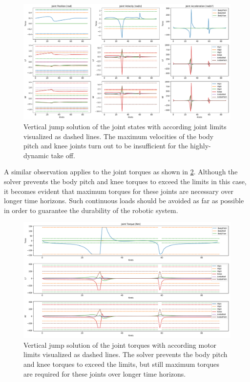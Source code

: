 \begin{figure}[h!]
\centering	
\includegraphics[width=1\textwidth]{fig/jumpVertical/JointState}
\caption{Vertical jump solution of the joint states with according joint limits visualized as dashed lines. The maximum velocities of the body pitch and knee joints turn out to be insufficient for the highly-dynamic take off.}
\label{fig:jumpVertical_JointState}
\end{figure} 

A similar observation applies to the joint torques as shown in \cref{fig:jumpVertical_JointTorques}. Although the solver prevents the body pitch and knee torques to exceed the limits in this case, it becomes evident that maximum torques for these joints are necessary over longer time horizons. Such continuous loads should be avoided as far as possible in order to guarantee the durability of the robotic system.

\begin{figure}[h!]
\centering	
\includegraphics[width=1\textwidth]{fig/jumpVertical/JointTorques}
\caption{Vertical jump solution of the joint torques with according motor limits visualized as dashed lines. The solver prevents the body pitch and knee torques to exceed the limits, but still maximum torques are required for these joints over longer time horizons.}
\label{fig:jumpVertical_JointTorques}
\end{figure} 

